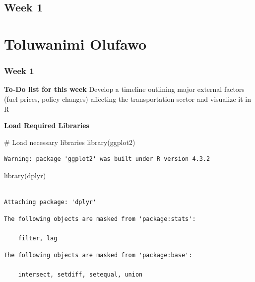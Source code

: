 \documentclass[
  letterpaper,
  DIV=11,
  numbers=noendperiod]{scrreprt}
\newenvironment{Shaded}{\begin{snugshade}}{\end{snugshade}}
\newcommand{\CommentTok}[1]{\textcolor[rgb]{0.37,0.37,0.37}{#1}}
\newcommand{\FunctionTok}[1]{\textcolor[rgb]{0.28,0.35,0.67}{#1}}
\newcommand{\NormalTok}[1]{\textcolor[rgb]{0.00,0.23,0.31}{#1}}
\begin{document}
\section{Week 1}\label{week-1-11}

\chapter{Toluwanimi Olufawo}\label{toluwanimi-olufawo-1}

\subsection{Week 1}\label{week-1-12}

\textbf{To-Do list for this week} Develop a timeline outlining major
external factors (fuel prices, policy changes) affecting the
transportation sector and visualize it in R

\textbf{Load Required Libraries}

\begin{Shaded}
\begin{Highlighting}[]
\CommentTok{\# Load necessary libraries}
\FunctionTok{library}\NormalTok{(ggplot2)}
\end{Highlighting}
\end{Shaded}

\begin{verbatim}
Warning: package 'ggplot2' was built under R version 4.3.2
\end{verbatim}

\begin{Shaded}
\begin{Highlighting}[]
\FunctionTok{library}\NormalTok{(dplyr)}
\end{Highlighting}
\end{Shaded}

\begin{verbatim}

Attaching package: 'dplyr'
\end{verbatim}

\begin{verbatim}
The following objects are masked from 'package:stats':

    filter, lag
\end{verbatim}

\begin{verbatim}
The following objects are masked from 'package:base':

    intersect, setdiff, setequal, union
\end{verbatim}
\end{document}

